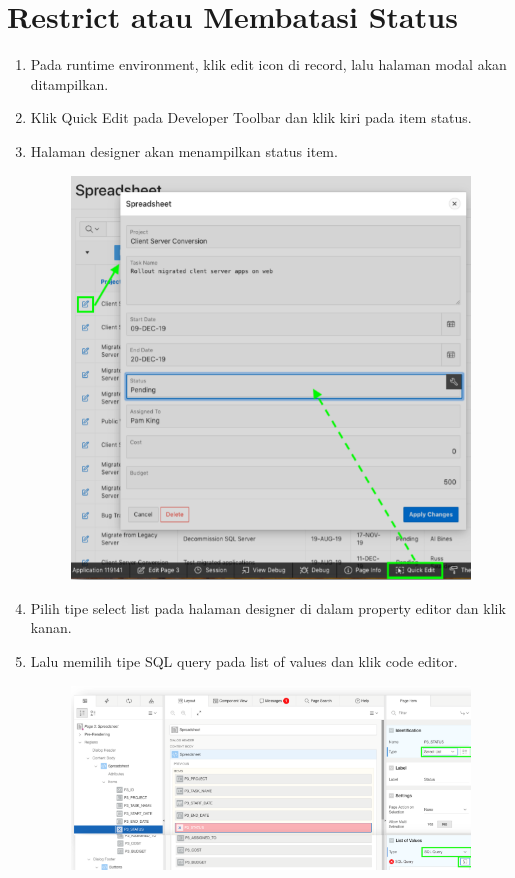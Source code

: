 \section{Restrict atau Membatasi Status}
\begin{enumerate}
    \item{Pada runtime environment, klik edit icon di record, lalu halaman modal akan ditampilkan.}
    \item{Klik Quick Edit pada Developer Toolbar dan klik kiri pada item status.}
    \item{Halaman designer akan menampilkan status item.}
\begin{figure}[!htbp]
    \centering
    \includegraphics[scale=0.5]{section/gambar_bab2/status.png}
    \label{penanda}
\end{figure}
    \item{Pilih tipe select list pada halaman designer di dalam property editor dan klik kanan.}
    \item{Lalu memilih tipe SQL query pada list of values dan klik code editor.}
\begin{figure}[!htbp]
    \centering
    \includegraphics[scale=0.5]{section/gambar_bab2/status2.png}

\end{figure}
\end{enumerate}
